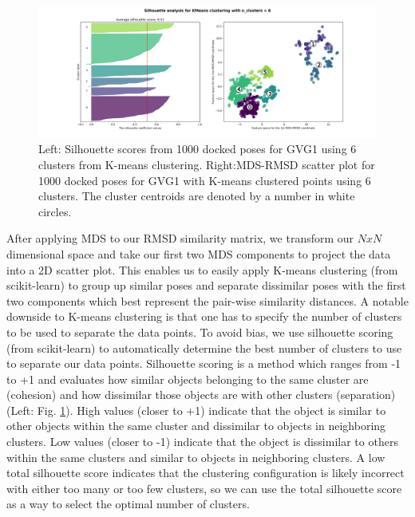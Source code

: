 \begin{figure}
    \centering
    \includegraphics[width=\linewidth]{chapter6/Figures/GVG_1-mds_6.png}
    \caption[Silhouette scoring in MDS-RMSD space]{Left: Silhouette scores from 1000 docked poses for GVG1 using 6 clusters from K-means clustering. Right:MDS-RMSD scatter plot for 1000 docked poses for GVG1 with K-means clustered points using 6 clusters. The cluster centroids are denoted by a number in white circles.}
    \label{fig:mds}
\end{figure}

After applying MDS to our RMSD similarity matrix, we transform our $N x N$ dimensional space and take our first two MDS components to project the data into a 2D scatter plot.
This enables us to easily apply K-means clustering \cite{scikit_kmeans} (from scikit-learn) to group up similar poses and separate dissimilar poses with the first two components which best represent the pair-wise similarity distances.
A notable downside to K-means clustering is that one has to specify the number of clusters to be used to separate the data points.
To avoid bias, we use silhouette scoring \cite{scikit_silhouette} (from scikit-learn) to automatically determine the best number of clusters to use to separate our data points.
Silhouette scoring is a method which ranges from -1 to +1 and evaluates how similar objects belonging to the same cluster are (cohesion) and how dissimilar those objects are with other clusters (separation) (Left: Fig. \ref{fig:mds}).
High values (closer to +1) indicate that the object is similar to other objects within the same cluster and dissimilar to objects in neighboring clusters.
Low values (closer to -1) indicate that the object is dissimilar to others within the same clusters and similar to objects in neighboring clusters.
A low total silhouette score indicates that the clustering configuration is likely incorrect with either too many or too few clusters, so we can use the total silhouette score as a way to select the optimal number of clusters.


